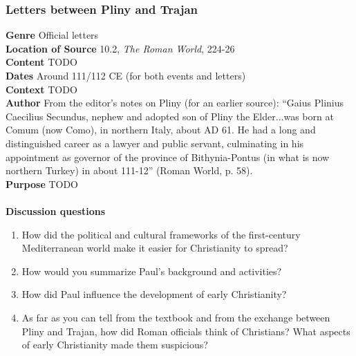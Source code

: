 \documentclass{article}
\begin{document}
\subsubsection*{Letters between Pliny and Trajan}
\textbf{Genre}
Official letters \\
\textbf{Location of Source}
10.2, \textit{The Roman World}, 224-26 \\
\textbf{Content}
TODO \\
\textbf{Dates}
Around 111/112 CE (for both events and letters) \\
\textbf{Context}
TODO \\
\textbf{Author}
From the editor’s notes on Pliny (for an earlier source): “Gaius Plinius Caecilius Secundus, nephew and adopted son of Pliny the Elder...was born at Comum (now Como), in northern Italy, about AD 61.  He had a long and distinguished career as a lawyer and public servant, culminating in his appointment as governor of the province of Bithynia-Pontus (in what is now northern Turkey) in about 111-12” (Roman World, p. 58). \\
\textbf{Purpose}
TODO \\
\\
\textbf{Discussion questions}
\begin{enumerate}
  \item How did the political and cultural frameworks of the first-century Mediterranean world make it easier for Christianity to spread?
  \item How would you summarize Paul’s background and activities?
  \item How did Paul influence the development of early Christianity?
  \item As far as you can tell from the textbook and from the exchange between Pliny and Trajan, how did Roman officials think of Christians? What aspects of early Christianity made them suspicious?
\end{enumerate}
\end{document}
